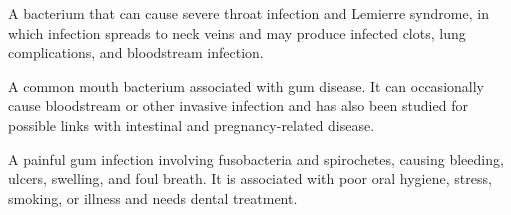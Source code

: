  A bacterium that can cause severe throat infection and Lemierre syndrome, in which infection spreads to neck veins and may produce infected clots, lung complications, and bloodstream infection.

 A common mouth bacterium associated with gum disease. It can occasionally cause bloodstream or other invasive infection and has also been studied for possible links with intestinal and pregnancy-related disease.

 A painful gum infection involving fusobacteria and spirochetes, causing bleeding, ulcers, swelling, and foul breath. It is associated with poor oral hygiene, stress, smoking, or illness and needs dental treatment.
